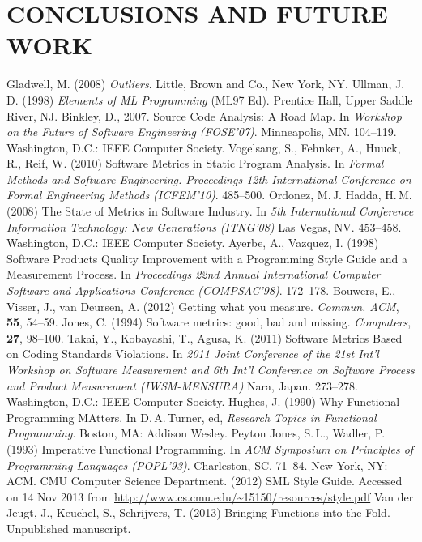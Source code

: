 \documentclass[12pt,abstracton]{scrartcl}
\begin{document}
\section{CONCLUSIONS AND FUTURE WORK}\label{sec:future}
\begin{thebibliography}{99}
 Gladwell, M. (2008) \emph{Outliers}. Little, Brown and Co., New York, NY.
 Ullman, J.\,D. (1998) \emph{Elements of ML Programming} (ML97 Ed). Prentice Hall, Upper Saddle River, NJ.
 Binkley, D., 2007. Source Code Analysis: A Road Map. In \emph{Workshop on the Future of Software Engineering (FOSE'07)}. Minneapolis, MN. 104--119. Washington, D.C.: IEEE Computer Society.
 Vogelsang, S., Fehnker, A., Huuck, R., Reif, W. (2010) Software Metrics in Static Program Analysis. In \emph{Formal Methods and Software Engineering. Proceedings 12th International Conference on Formal Engineering Methods (ICFEM'10)}. 485--500.
 Ordonez, M.\,J. Hadda, H.\,M. (2008) The State of Metrics in Software Industry. In \emph{5th International Conference Information Technology: New Generations (ITNG'08)} Las Vegas, NV. 453--458. Washington, D.C.: IEEE Computer Society.
 Ayerbe, A., Vazquez, I. (1998) Software Products Quality Improvement with a Programming Style Guide and a Measurement Process. In \emph{Proceedings 22nd Annual International Computer Software and Applications Conference (COMPSAC'98)}. 172--178.
 Bouwers, E., Visser, J., van Deursen, A. (2012) Getting what you measure. \emph{Commun. ACM}, \textbf{55}, 54--59.
 Jones, C. (1994) Software metrics: good, bad and missing. \emph{Computers}, \textbf{27}, 98--100.
 Takai, Y., Kobayashi, T., Agusa, K. (2011) Software Metrics Based on Coding Standards Violations. In \emph{2011 Joint Conference of the 21st Int'l Workshop on Software Measurement and 6th Int'l Conference on Software Process and Product Measurement (IWSM-MENSURA)} Nara, Japan. 273--278. Washington, D.C.: IEEE Computer Society.
 Hughes, J. (1990) Why Functional Programming MAtters. In D.\,A.\,Turner, ed, \emph{Research Topics in Functional Programming}. Boston, MA: Addison Wesley.
 Peyton Jones, S.\,L., Wadler, P. (1993) Imperative Functional Programming. In \emph{ACM Symposium on Principles of Programming Languages (POPL'93)}. Charleston, SC. 71--84. New York, NY: ACM.
 CMU Computer Science Department. (2012) SML Style Guide. Accessed on 14 Nov 2013 from \url{http://www.cs.cmu.edu/~15150/resources/style.pdf}
 Van der Jeugt, J., Keuchel, S., Schrijvers, T. (2013) Bringing Functions into the Fold. Unpublished manuscript.
\end{thebibliography}
\end{document}
